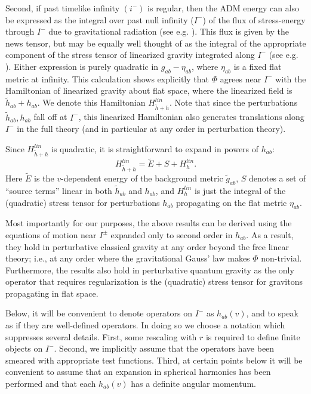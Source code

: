 \documentclass[12pt,onecolumn,eqsecnum,aps,prd,nofootinbib]{revtex4}
\def\be{\begin{equation}}
\def\ee{\end{equation}}
\begin{document}
Second, if past timelike infinity $(i^-)$ is regular, then the ADM
energy can also be expressed as the integral over past null infinity
($I^-$) of the flux of stress-energy through $I^-$ due to
gravitational radiation (see e.g. \cite{ABR}). This flux is given by
the news tensor, but may be equally well thought of as the integral
of the appropriate component of the stress tensor of linearized
gravity integrated along $I^-$ (see e.g. \cite{CZ}).  Either
expression is purely quadratic in $g_{ab} - \eta_{ab}$, where
$\eta_{ab}$ is a fixed flat metric at infinity. This calculation
shows explicitly that $\Phi$ agrees near $I^-$ with the Hamiltonian of
linearized gravity about flat space, where the linearized field is $\tilde h_{ab} + h_{ab}$. We denote this
Hamiltonian $H^{lin}_{\tilde h + h}$.   Note that since the
perturbations $\tilde h_{ab}, h_{ab}$ fall off at $I^-$, this
linearized Hamiltonian also generates translations along $I^-$ in
the full theory (and in particular at any order in perturbation
theory).

Since $H^{lin}_{\tilde h + h}$ is quadratic, it is straightforward
to expand in powers of $h_{ab}$:
 \be
 \label{expandH}
 H^{lin}_{\tilde h + h} = \tilde E + S +  H^{lin}_{h}.
 \ee
Here $\tilde E$ is the $v$-dependent energy of the background metric $\tilde
g_{ab}$, $S$ denotes a set of ``source terms'' linear in both
$\tilde h_{ab}$ and $h_{ab}$, and $H^{lin}_{h}$ is just the integral
of the (quadratic) stress tensor for perturbations $h_{ab}$
propagating on the flat metric $\eta_{ab}$.

Most importantly for our purposes, the above results can be derived
using the equations of motion near $I^\pm$ expanded only to second
order in $h_{ab}$.  As a result, they hold in perturbative classical
gravity at any order beyond the free linear theory; i.e., at any
order where the gravitational Gauss' law makes $\Phi$ non-trivial.
Furthermore, the results also hold in perturbative quantum gravity
as the only operator that requires regularization is the (quadratic)
stress tensor for gravitons propagating in flat space.

Below, it will be convenient to denote operators on $I^-$ as
$h_{ab}(v)$, and to speak as if they are well-defined operators. In
doing so we choose a notation which suppresses several details.
First, some rescaling with $r$ is required to define finite objects
on $I^-$.  Second, we implicitly assume that the operators have been
smeared with appropriate test functions. Third, at certain points
below it will be convenient to assume that an expansion in spherical
harmonics has been performed and that each $h_{ab}(v)$ has a
definite angular momentum.
\end{document}
